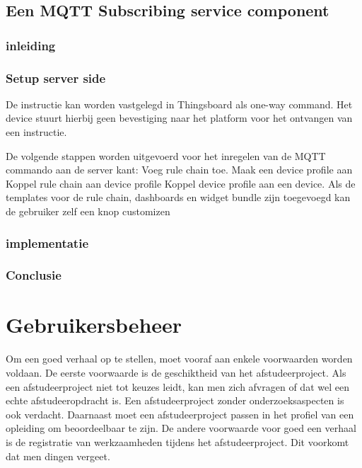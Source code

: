 		\section{Een MQTT Subscribing service component}
		
		\subsection{inleiding}
		 
		 
		\subsection{Setup server side}
		De instructie kan worden vastgelegd in Thingsboard als one-way command. Het device stuurt hierbij geen bevestiging naar het platform voor het ontvangen van een instructie.
		
		De volgende stappen worden uitgevoerd voor het inregelen van de MQTT commando aan de server kant:
		Voeg rule chain toe.
		Maak een device profile aan
		Koppel rule chain aan device profile
		Koppel device profile aan een device.
		Als de templates voor de rule chain, dashboards en widget bundle zijn toegevoegd kan de gebruiker zelf een knop customizen
		
		 
		
		\subsection{implementatie}
		
	 
		
		
		
		
		\subsection{Conclusie}
		
		\chapter{Gebruikersbeheer}
		
		Om een goed verhaal op te stellen, moet vooraf aan enkele voorwaarden
		worden voldaan. De eerste voorwaarde is de geschiktheid van het
		afstudeerproject. Als een afstudeerproject niet tot keuzes leidt, kan
		men zich afvragen of dat wel een echte afstudeeropdracht is. Een
		afstudeerproject zonder onderzoeksaspecten is ook verdacht. Daarnaast
		moet een afstudeerproject passen in het profiel van een opleiding om
		beoordeelbaar te zijn. De andere voorwaarde voor goed een verhaal is
		de registratie van werkzaamheden tijdens het afstudeerproject. Dit
		voorkomt dat men dingen vergeet.
